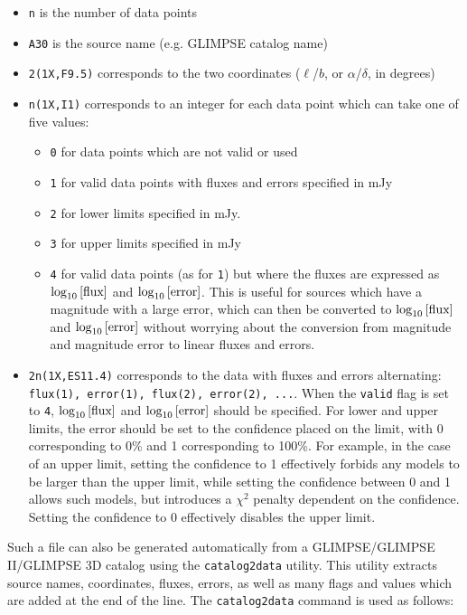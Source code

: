 \documentclass[letterpaper,11pt]{report}
\begin{document}
\begin{itemize}
\item \texttt{n} is the number of data points
\item \texttt{A30} is the source name (e.g. GLIMPSE catalog name)
\item \texttt{2(1X,F9.5)} corresponds to the two coordinates ($\ell$/$b$, or $\alpha$/$\delta$, in degrees)
\item \texttt{n(1X,I1)} corresponds to an integer for each data point which can take one of five values:
\begin{itemize}
\item \texttt{0} for data points which are not valid or used
\item \texttt{1} for valid data points with fluxes and errors specified in mJy
\item \texttt{2} for lower limits specified in mJy.
\item \texttt{3} for upper limits specified in mJy
\item \texttt{4} for valid data points (as for \texttt{1}) but where the fluxes are expressed as $\log_{10}{\rm [flux]}$ and $\log_{10}{\rm [error]}$. This is useful for sources which have a magnitude with a large error, which can then be converted to $\log_{10}{\rm [flux]}$ and $\log_{10}{\rm [error]}$ without worrying about the conversion from magnitude and magnitude error to linear fluxes and errors.
\end{itemize}
\item \texttt{2n(1X,ES11.4)} corresponds to the data with fluxes and errors alternating: \texttt{flux(1), error(1), flux(2), error(2), ...}. When the \texttt{valid} flag is set to \texttt{4},  $\log_{10}{\rm [flux]}$ and $\log_{10}{\rm [error]}$ should be specified. {\color{red} For lower and upper limits, the error should be set to the confidence placed on the limit, with 0 corresponding to 0\% and 1 corresponding to 100\%. For example, in the case of an upper limit, setting the confidence to 1 effectively forbids any models to be larger than the upper limit, while setting the confidence between 0 and 1 allows such models, but introduces a $\chi^2$ penalty dependent on the confidence. Setting the confidence to 0 effectively disables the upper limit.}
\end{itemize}

Such a file can also be generated automatically from a GLIMPSE/GLIMPSE II/GLIMPSE 3D catalog using the \texttt{catalog2data} utility. This utility extracts source names, coordinates, fluxes, errors, as well as many flags and values which are added at the end of the line. The \texttt{catalog2data} command is used as follows:
\end{document}
